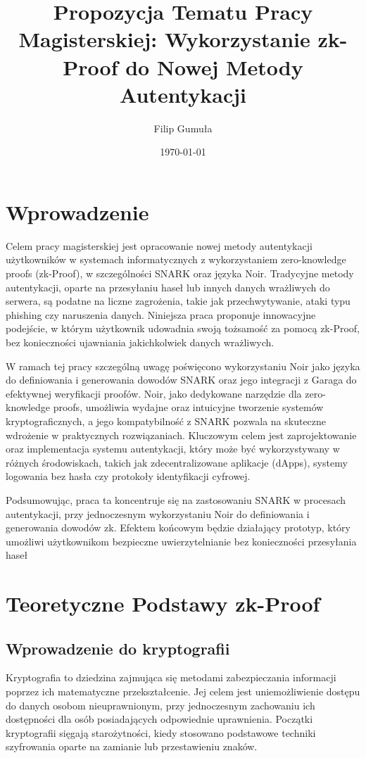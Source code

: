 \documentclass{article}
\title{Propozycja Tematu Pracy Magisterskiej: Wykorzystanie zk-Proof do Nowej Metody Autentykacji}
\author{Filip Gumuła}
\date{\today}
\begin{document}
\maketitle
\newpage
\tableofcontents 
\newpage

\section{Wprowadzenie}
Celem pracy magisterskiej jest opracowanie nowej metody autentykacji użytkowników w systemach informatycznych z wykorzystaniem zero-knowledge proofs (zk-Proof), 
w szczególności SNARK oraz języka Noir. Tradycyjne metody autentykacji, oparte na przesyłaniu haseł lub innych danych wrażliwych do serwera, są podatne na liczne zagrożenia, 
takie jak przechwytywanie, ataki typu phishing czy naruszenia danych. Niniejsza praca proponuje innowacyjne podejście, 
w którym użytkownik udowadnia swoją tożsamość za pomocą zk-Proof, bez konieczności ujawniania jakichkolwiek danych wrażliwych.

W ramach tej pracy szczególną uwagę poświęcono wykorzystaniu Noir jako języka do definiowania i generowania dowodów SNARK oraz jego integracji z 
Garaga do efektywnej weryfikacji proofów. Noir, jako dedykowane narzędzie dla zero-knowledge proofs, 
umożliwia wydajne oraz intuicyjne tworzenie systemów kryptograficznych, a jego kompatybilność z SNARK 
pozwala na skuteczne wdrożenie w praktycznych rozwiązaniach. Kluczowym celem jest zaprojektowanie oraz implementacja systemu autentykacji, 
który może być wykorzystywany w różnych środowiskach, takich jak zdecentralizowane aplikacje (dApps), systemy logowania bez hasła czy protokoły identyfikacji cyfrowej.

Podsumowując, praca ta koncentruje się na zastosowaniu SNARK w procesach autentykacji, przy jednoczesnym wykorzystaniu Noir do definiowania i generowania dowodów zk. 
Efektem końcowym będzie działający prototyp, który umożliwi użytkownikom bezpieczne uwierzytelnianie bez konieczności przesyłania haseł

\newpage
\section{Teoretyczne Podstawy zk-Proof}

\subsection{Wprowadzenie do kryptografii}
Kryptografia to dziedzina zajmująca się metodami zabezpieczania informacji poprzez ich matematyczne przekształcenie. 
Jej celem jest uniemożliwienie dostępu do danych osobom nieuprawnionym, przy jednoczesnym zachowaniu ich dostępności dla osób posiadających odpowiednie uprawnienia. 
Początki kryptografii sięgają starożytności, kiedy stosowano podstawowe techniki szyfrowania oparte na zamianie lub przestawieniu znaków.
\end{document}
